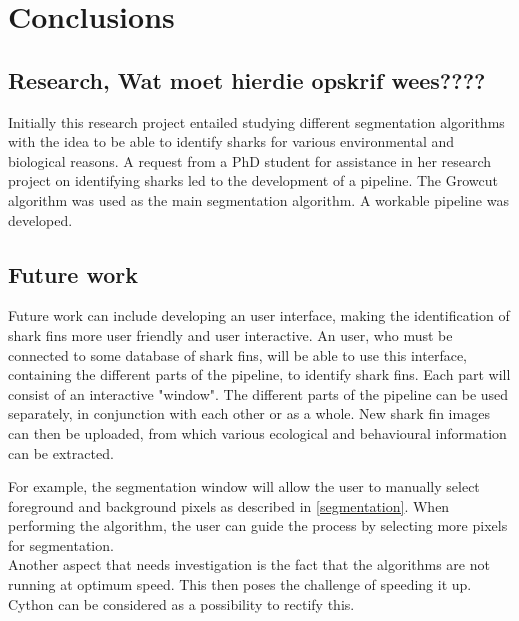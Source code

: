 \documentclass[a4paper,10pt]{article}
\begin{document}
\subsection{}


\newpage
\section{Conclusions}
\subsection{Research, Wat moet hierdie opskrif wees????}
Initially this research project entailed studying different segmentation algorithms with the idea to be able to identify sharks for various environmental and biological reasons.
A request from a PhD student for assistance in her research project on identifying sharks led to the development of a pipeline. The Growcut algorithm was used as the main segmentation algorithm. A workable pipeline was developed. \\





\subsection{}


\subsection{Future work}
Future work can include developing an user interface, making the identification of shark fins more user friendly and user interactive.
An user, who must be connected to some database of shark fins, will be able to use this interface, containing the different parts of the pipeline, to identify shark fins.  Each part will consist of an interactive "window".  The different parts of the pipeline can be used separately, in conjunction with each other or as a whole.  New shark fin images can then be uploaded, from which various ecological and behavioural information can be extracted.

For example, the segmentation window will allow the user to manually select foreground and background pixels as described in \ref{segmentation}.
When performing the algorithm, the user can guide the process by selecting more pixels for segmentation. \\

Another aspect that needs investigation is the fact that the algorithms are not running at optimum speed.  This then poses the challenge of speeding it up.  Cython can be considered as a possibility to rectify this. \\
\end{document}
